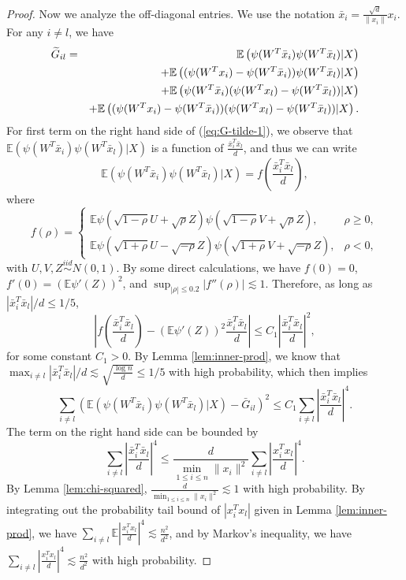 \begin{proof}
Now we analyze the off-diagonal entries. We use the notation $\bar{x}_i=\frac{\sqrt{d}}{\|x_i\|}x_i$. For any $i\neq l$, we have
\begin{eqnarray}
\label{eq:G-tilde-1} \wt{G}_{il} &=& \mathbb{E}\left(\psi(W^T\bar{x}_i)\psi(W^T\bar{x}_l)|X\right) \\
\label{eq:G-tilde-2} && + \mathbb{E}\left((\psi(W^Tx_i)-\psi(W^T\bar{x}_i))\psi(W^T\bar{x}_l)|X\right) \\
\label{eq:G-tilde-3} && + \mathbb{E}\left(\psi(W^T\bar{x}_i)(\psi(W^Tx_l)-\psi(W^T\bar{x}_l))|X\right) \\
\label{eq:G-tilde-4} && + \mathbb{E}\left((\psi(W^Tx_i)-\psi(W^T\bar{x}_i))(\psi(W^Tx_l)-\psi(W^T\bar{x}_l))|X\right).
\end{eqnarray}
For first term on the right hand side of (\ref{eq:G-tilde-1}), we observe that $\mathbb{E}\left(\psi(W^T\bar{x}_i)\psi(W^T\bar{x}_l)|X\right)$ is a function of $\frac{\bar{x}_i^T\bar{x}_l}{d}$, and thus we can write
$$\mathbb{E}\left(\psi(W^T\bar{x}_i)\psi(W^T\bar{x}_l)|X\right)=f\left(\frac{\bar{x}_i^T\bar{x}_l}{d}\right),$$
where
$$f(\rho) = \begin{cases}
\mathbb{E}\psi(\sqrt{1-\rho}U+\sqrt{\rho}Z)\psi(\sqrt{1-\rho}V+\sqrt{\rho}Z), & \rho \geq 0, \\
\mathbb{E}\psi(\sqrt{1+\rho}U-\sqrt{-\rho}Z)\psi(\sqrt{1+\rho}V+\sqrt{-\rho}Z), & \rho < 0,
\end{cases}$$
with $U,V,Z\stackrel{iid}{\sim} N(0,1)$. By some direct calculations, we have $f(0)=0$, $f'(0)=(\mathbb{E}\psi'(Z))^2$, and $\sup_{|\rho|\leq 0.2}|f''(\rho)|\lesssim 1$. Therefore, as long as $|\bar{x}_i^T\bar{x}_l|/d\leq 1/5$,
$$\left|f\left(\frac{\bar{x}_i^T\bar{x}_l}{d}\right)-(\mathbb{E}\psi'(Z))^2\frac{\bar{x}_i^T\bar{x}_l}{d}\right|\leq C_1\left|\frac{\bar{x}_i^T\bar{x}_l}{d}\right|^2,$$
for some constant $C_1>0$. By Lemma \ref{lem:inner-prod}, we know that $\max_{i\neq l}|\bar{x}_i^T\bar{x}_l|/d\lesssim \sqrt{\frac{\log n}{d}}\leq 1/5$ with high probability, which then implies
\begin{equation}
\sum_{i\neq l}\left(\mathbb{E}\left(\psi(W^T\bar{x}_i)\psi(W^T\bar{x}_l)|X\right)-\bar{G}_{il}\right)^2 \leq C_1\sum_{i\neq l}\left|\frac{\bar{x}_i^T\bar{x}_l}{d}\right|^4. \label{eq:G-H}
\end{equation}
The term on the right hand side can be bounded by
$$\sum_{i\neq l}\left|\frac{\bar{x}_i^T\bar{x}_l}{d}\right|^4\leq \frac{d}{\min_{1\leq i\leq n}\|x_i\|^2}\sum_{i\neq l}\left|\frac{x_i^Tx_l}{d}\right|^4.$$
By Lemma \ref{lem:chi-squared}, $\frac{d}{\min_{1\leq i\leq n}\|x_i\|^2}\lesssim 1$ with high probability. By integrating out the probability tail bound of $|x_i^Tx_l|$ given in Lemma \ref{lem:inner-prod}, we have $\sum_{i\neq l}\mathbb{E}\left|\frac{x_i^Tx_l}{d}\right|^4\lesssim \frac{n^2}{d^2}$, and by Markov's inequality, we have $\sum_{i\neq l}\left|\frac{x_i^Tx_l}{d}\right|^4\lesssim \frac{n^2}{d^2}$ with high probability.


\end{proof}
